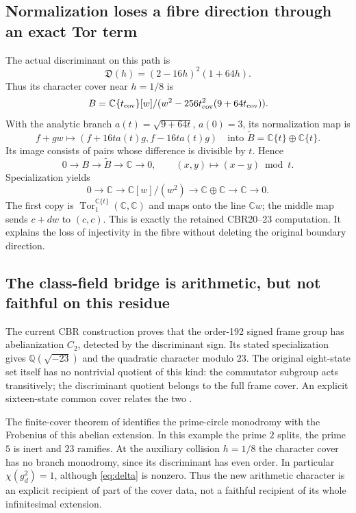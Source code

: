 \documentclass[11pt,a4paper]{article}
\theoremstyle{definition}
\newcommand{\Q}{\mathbb Q}\newcommand{\C}{\mathbb C}\newcommand{\R}{\mathbb R}\newcommand{\Z}{\mathbb Z}
\begin{document}
\subsection{Normalization loses a fibre direction through an exact Tor term}
The actual discriminant on this path is
\[
 \mathfrak D(h)=(2-16h)^2(1+64h).
\]
Thus its character cover near $h=1/8$ is
\[
 B=\C\{t_{\rm cov}\}[w]/
 (w^2-256t_{\rm cov}^2(9+64t_{\rm cov})).
\]
With the analytic branch $a(t)=\sqrt{9+64t}$, $a(0)=3$, its normalization map is
\[
 f+gw\longmapsto(f+16ta(t)g,f-16ta(t)g)
 \quad\text{into }\widetilde B=\C\{t\}\oplus\C\{t\}.
\]
Its image consists of pairs whose difference is divisible by $t$. Hence
\[
 0\longrightarrow B\longrightarrow\widetilde B
 \longrightarrow\C\longrightarrow0,
 \qquad (x,y)\longmapsto(x-y)\bmod t.
\]
Specialization yields
\begin{equation}\label{eq:tor}
 0\longrightarrow\C
 \longrightarrow\C[w]/(w^2)
 \longrightarrow\C\oplus\C
 \longrightarrow\C\longrightarrow0.
\end{equation}
The first copy is $\operatorname{Tor}_1^{\C\{t\}}(\C,\C)$ and maps onto the line $\C w$; the middle map sends $c+dw$ to $(c,c)$. This is exactly the retained CBR20--23 computation. It explains the loss of injectivity in the fibre without deleting the original boundary direction.

\subsection{The class-field bridge is arithmetic, but not faithful on this residue}
The current CBR construction proves that the order-192 signed frame group has abelianization $C_2$, detected by the discriminant sign. Its stated specialization gives $\Q(\sqrt{-23})$ and the quadratic character modulo $23$. The original eight-state set itself has no nontrivial quotient of this kind: the commutator subgroup acts transitively; the discriminant quotient belongs to the full frame cover. An explicit sixteen-state common cover relates the two \citep[CBR1--18]{CBR}.

The finite-cover theorem of \citet[Theorem 1]{CC} identifies the prime-circle monodromy with the Frobenius of this abelian extension. In this example the prime $2$ splits, the prime $5$ is inert and $23$ ramifies. At the auxiliary collision $h=1/8$ the character cover has no branch monodromy, since its discriminant has even order. In particular $\chi(g_d^2)=1$, although \eqref{eq:delta} is nonzero. Thus the new arithmetic character is an explicit recipient of part of the cover data, not a faithful recipient of its whole infinitesimal extension.
\end{document}
